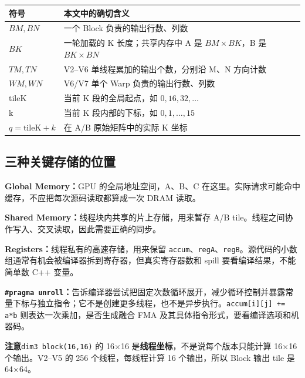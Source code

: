 \documentclass[UTF8,11pt,a4paper,fontset=fandol]{ctexart}
\newcommand{\code}[1]{\nolinkurl{#1}}
\newcommand{\caution}[1]{\par\noindent\colorbox{PaleOrange}{\parbox{\dimexpr\linewidth-2\fboxsep\relax}{\textbf{注意}\quad #1}}\par}
\newcommand{\pagebreakhere}{\clearpage}
\begin{document}
\noindent\begin{tabularx}{\linewidth}{lX}
\toprule
符号 & 本文中的确切含义\\\midrule
$BM,BN$ & 一个 Block 负责的输出行数、列数\\
$BK$ & 一轮加载的 K 长度；共享内存中 A 是 $BM\times BK$，B 是 $BK\times BN$\\
$TM,TN$ & V2--V6 单线程累加的输出个数，分别沿 M、N 方向计数\\
$WM,WN$ & V6/V7 单个 Warp 负责的输出行数、列数\\
tileK & 当前 K 段的全局起点，如 $0,16,32,\ldots$\\
k & 当前 K 段内部的下标，如 $0,1,\ldots,15$\\
$q=\mathrm{tileK}+k$ & 在 A/B 原始矩阵中的实际 K 坐标\\\bottomrule
\end{tabularx}

\subsection{三种关键存储的位置}
\textbf{Global Memory：}GPU 的全局地址空间，A、B、C 在这里。实际请求可能命中缓存，不应把每次源码读取都算成一次 DRAM 读取。

\textbf{Shared Memory：}线程块内共享的片上存储，用来暂存 A/B tile。线程之间协作写入、交叉读取，因此需要正确的同步。

\textbf{Registers：}线程私有的高速存储，用来保留 \code{accum}、\code{regA}、\code{regB}。源代码的小数组通常有机会被编译器拆到寄存器，但真实寄存器数和 spill 要看编译结果，不能简单数 C++ 变量。

\textbf{\texttt{\#pragma unroll}：}告诉编译器尝试把固定次数循环展开，减少循环控制并暴露常量下标与独立指令；它不是创建更多线程，也不是异步执行。\code{accum[i][j] += a*b} 则表达一次乘加，是否生成融合 FMA 及其具体指令形式，要看编译选项和机器码。

\caution{\code{dim3 block(16,16)} 的 16×16 是\textbf{线程坐标}，不是说每个版本只能计算 16×16 个输出。V2--V5 的 256 个线程，每线程计算 16 个输出，所以 Block 输出 tile 是 64×64。}
\pagebreakhere
\end{document}
